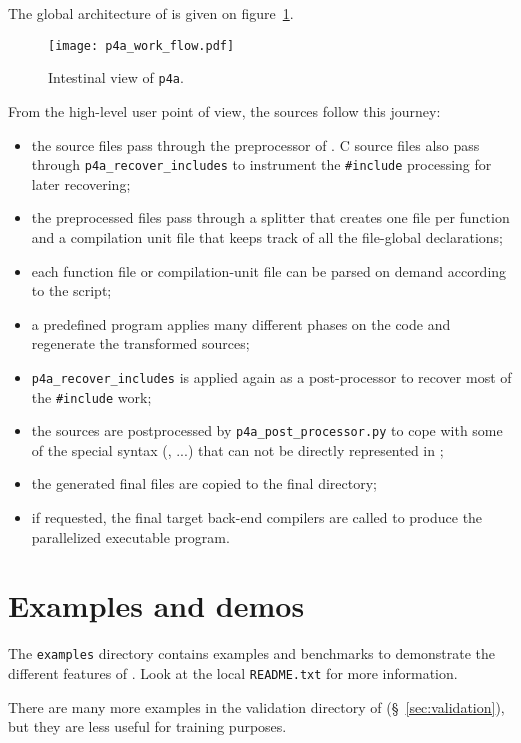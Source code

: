 \documentclass[a4paper]{article}
\begin{document}
The global architecture of \Apfa is given on
figure~\ref{fig:transit_intestinal}.

\begin{figure}
  \texttt{[image: p4a\_work\_flow.pdf]}
  \caption{Intestinal view of \texttt{p4a}.}
  \label{fig:transit_intestinal}
\end{figure}

From the high-level user point of view, the sources follow this journey:
\begin{itemize}
\item the source files pass through the preprocessor of
  \Apips. C source files also pass through
  \verb|p4a_recover_includes| to instrument the
  \verb|#include| processing for later recovering;
\item the preprocessed files pass through a splitter that creates
  one file per function and a compilation unit file that keeps track
  of all the file-global declarations;
\item each function file or compilation-unit file can be parsed on
  demand according to the \Apyps script;
\item a predefined \Apyps program applies many different \Apips phases on
  the code and regenerate the transformed sources;
\item \verb|p4a_recover_includes| is applied again as a post-processor
  to recover most of the \verb|#include| work;
\item the sources are postprocessed by
  \verb|p4a_post_processor.py| to cope with some of the special syntax
  (\Acuda, \Aopencl...) that can not be directly represented in \Apips;
\item the generated final files are copied to the final directory;
\item if requested, the final target back-end compilers are called to
  produce the parallelized executable program.
\end{itemize}



\section{Examples and demos}
\label{sec:examples-demos}

The \texttt{examples} directory contains examples and benchmarks to
demonstrate the different features of \Apfa. Look at the local
\texttt{README.txt} for more information.

There are many more examples in the validation directory of \Apfa
(\S~\ref{sec:validation}), but they are less useful for training purposes.
\end{document}
